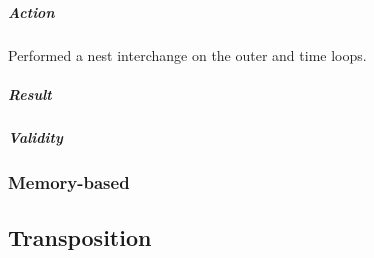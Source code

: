 \subparagraph{Action} Performed a nest interchange on the outer and time loops.

\subparagraph{Result}

\subparagraph{Validity}


\subsubsection{Memory-based}


\subsection{Transposition}

